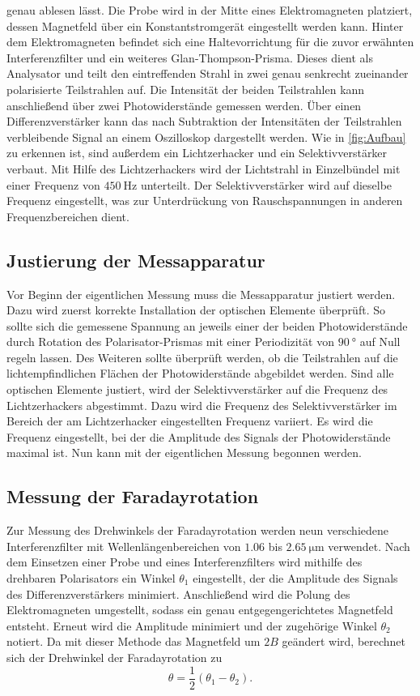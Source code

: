 genau ablesen lässt. Die Probe wird in der Mitte eines Elektromagneten platziert, dessen Magnetfeld über ein Konstantstromgerät eingestellt werden kann. 
Hinter dem Elektromagneten befindet sich eine Haltevorrichtung für die zuvor erwähnten Interferenzfilter und ein weiteres Glan-Thompson-Prisma. Dieses dient als 
Analysator und teilt den eintreffenden Strahl in zwei genau senkrecht zueinander polarisierte Teilstrahlen auf. Die Intensität der beiden Teilstrahlen kann anschließend 
über zwei Photowiderstände gemessen werden. Über einen Differenzverstärker kann das nach Subtraktion der Intensitäten der Teilstrahlen verbleibende Signal an einem 
Oszilloskop dargestellt werden. Wie in \autoref{fig:Aufbau} zu erkennen ist, sind außerdem ein \glqq Lichtzerhacker\grqq{} und ein Selektivverstärker verbaut. 
Mit Hilfe des Lichtzerhackers wird der Lichtstrahl in Einzelbündel mit einer Frequenz von $\qty{450}{\hertz}$ unterteilt. Der Selektivverstärker wird auf dieselbe 
Frequenz eingestellt, was zur Unterdrückung von Rauschspannungen in anderen Frequenzbereichen dient.

\subsection{Justierung der Messapparatur}
Vor Beginn der eigentlichen Messung muss die Messapparatur justiert werden. Dazu wird zuerst korrekte Installation der optischen Elemente überprüft. 
So sollte sich die gemessene Spannung an jeweils einer der beiden Photowiderstände durch Rotation des Polarisator-Prismas mit einer Periodizität von $\qty{90}{\degree}$ 
auf Null regeln lassen. Des Weiteren sollte überprüft werden, ob die Teilstrahlen auf die lichtempfindlichen Flächen der Photowiderstände abgebildet werden. 
Sind alle optischen Elemente justiert, wird der Selektivverstärker auf die Frequenz des Lichtzerhackers abgestimmt. Dazu wird die Frequenz des Selektivverstärker 
im Bereich der am Lichtzerhacker eingestellten Frequenz variiert. Es wird die Frequenz eingestellt, bei der die Amplitude des Signals der Photowiderstände maximal ist.
Nun kann mit der eigentlichen Messung begonnen werden.

\subsection{Messung der Faradayrotation}
\label{subsec:Messung der Faradayrotation}
Zur Messung des Drehwinkels der Faradayrotation werden neun verschiedene Interferenzfilter mit Wellenlängenbereichen von $\num{1.06}$ bis $\qty{2.65}{\micro\metre}$ verwendet.
Nach dem Einsetzen einer Probe und eines Interferenzfilters wird mithilfe des drehbaren Polarisators ein Winkel $\theta_1$ eingestellt, der die Amplitude des Signals des 
Differenzverstärkers 
minimiert. Anschließend wird die Polung des Elektromagneten umgestellt, sodass ein genau entgegengerichtetes Magnetfeld entsteht. Erneut wird die Amplitude minimiert und der 
zugehörige Winkel $\theta_2$ notiert. Da mit dieser Methode das Magnetfeld um $2B$ geändert wird, berechnet sich der Drehwinkel der Faradayrotation zu 
\begin{equation}
    \label{eqn:theta_diff}
    \theta = \frac{1}{2}(\theta_1 -\theta_2).
\end{equation}

